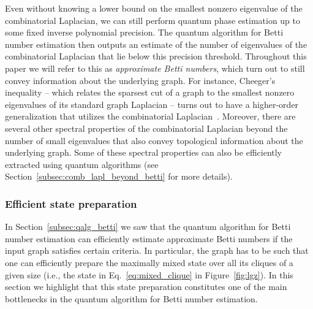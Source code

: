 \documentclass[a4paper, onecolumn, accepted=2022-08-28]{quantumarticle}
\begin{document}
Even without knowing a lower bound on the smallest nonzero eigenvalue of the combinatorial Laplacian, we can still perform quantum phase estimation up to some fixed inverse polynomial precision.
The quantum algorithm for Betti number estimation then outputs an estimate of the number of eigenvalues of the combinatorial Laplacian that lie below this precision threshold. 
Throughout this paper we will refer to this as \emph{approximate Betti numbers}, which  turn out to still convey information about the underlying graph.
For instance, Cheeger's inequality -- which relates the sparsest cut of a graph to the smallest nonzero eigenvalues of its standard graph Laplacian -- turns out to have a higher-order generalization that utilizes the combinatorial Laplacian~\cite{gundert:cheeger}.
Moreover, there are several other spectral properties of the combinatorial Laplacian beyond the number of small eigenvalues that also convey topological information about the underlying graph.
Some of these spectral properties can also be efficiently extracted using quantum algorithms (see Section~\ref{subsec:comb_lapl_beyond_betti} for more details).

\subsubsection{Efficient state preparation
  \label{subsubsec:clique_density}}

In Section~\ref{subsec:qalg_betti} we saw that the quantum algorithm for Betti number estimation can efficiently estimate approximate Betti numbers if the input graph satisfies certain criteria.
In particular, the graph has to be such that one can efficiently prepare the maximally mixed state over all its cliques of a given size (i.e., the state in Eq.~\eqref{eq:mixed_clique} in Figure~\ref{fig:lgz}).
In this section we highlight that this state preparation constitutes one of the main bottlenecks in the quantum algorithm for Betti number estimation.
\end{document}
